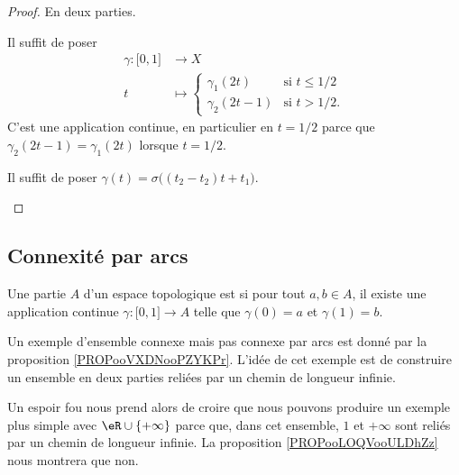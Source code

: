 \begin{proof}
	En deux parties.
	\begin{subproof}
		Il suffit de poser
		\begin{equation}
			\begin{aligned}
				\gamma\colon \mathopen[ 0,1\mathclose] & \to X                                         \\
				t                                      & \mapsto \begin{cases}
					                                                 \gamma_1(2t)   & \text{si } t\leq 1/2 \\
					                                                 \gamma_2(2t-1) & \text{si }t>1/2.
				                                                 \end{cases}
			\end{aligned}
		\end{equation}
		C'est une application continue, en particulier en \( t=1/2\) parce que \( \gamma_2(2t-1)=\gamma_1(2t)\) lorsque \( t=1/2\).

		Il suffit de poser \( \gamma(t)=\sigma\big( (t_2-t_2)t+t_1 \big)\).
	\end{subproof}
\end{proof}

\subsection{Connexité par arcs}


\begin{definition}      \label{DEFooOXVCooBizpgK}
	Une partie \( A\) d'un espace topologique est  si pour tout \( a,b \in A\), il existe une application continue \( \gamma\colon \mathopen[ 0 , 1 \mathclose]\to A\) telle que \( \gamma(0)=a\) et \( \gamma(1)=b\).
\end{definition}

\begin{normaltext}
	Un exemple d'ensemble connexe mais pas connexe par arcs est donné par la proposition \ref{PROPooVXDNooPZYKPr}. L'idée de cet exemple est de construire un ensemble en deux parties reliées par un chemin de longueur infinie.

	Un espoir fou nous prend alors de croire que nous pouvons produire un exemple plus simple avec \( \eR\cup\{ +\infty \}\) parce que, dans cet ensemble, \( 1\) et \( +\infty\) sont reliés par un chemin de longueur infinie. La proposition \ref{PROPooLOQVooULDhZz} nous montrera que non.
\end{normaltext}


